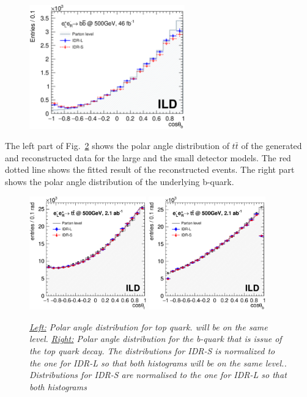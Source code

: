 \documentclass[preprint]{elsarticle}
\begin{document}
 \begin{figure}[h!]
\centering
  \includegraphics[width=0.6\textwidth]{figures_BBbar/result2models_v2.eps} 
\caption{}
\label{results_bb}
\end{figure}


The left part of Fig.~\ref{fig:res-ttbar} shows the polar angle distribution of $t\bar{t}$ of the generated and reconstructed data for the large and the small detector models. The red dotted line shows the fitted result of the reconstructed events. The right part shows the polar angle distribution of the underlying b-quark. 

\begin{figure}
\centering
\includegraphics[width=0.45\textwidth]{figures_TTbar/results2models_t.eps}
\includegraphics[width=0.45\textwidth]{figures_TTbar/results2models_b.eps}
\caption{\label{fig:res-ttbar} \sl \underline{Left:} Polar angle distribution for top quark.  will be on the same level. \underline{Right:}  Polar angle distribution for the b-quark that is issue of the top quark decay. The distributions for IDR-S is normalized to the one for IDR-L so that both histograms will be on the same level.. Distributions for IDR-S are normalised to the one for IDR-L so that both histograms}
\end{figure}
\end{document}
